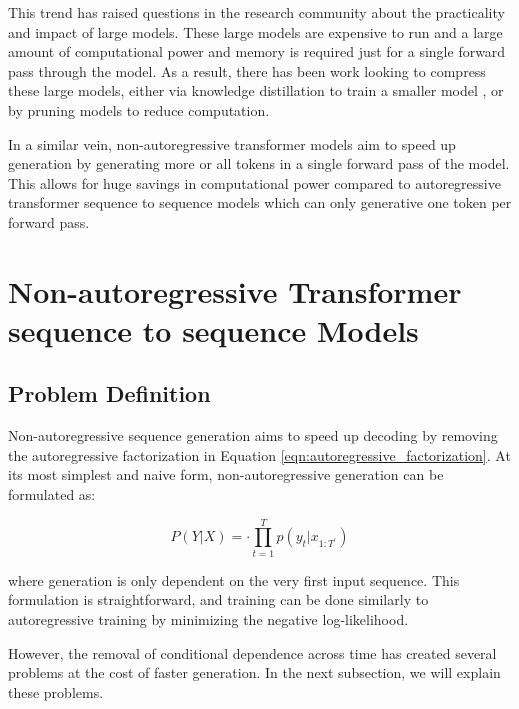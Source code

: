 This trend has raised questions in the research community about the practicality and impact \cite{schwartz_green_ai_2019} of large models. These large models are expensive to run and a large amount of computational power and memory is required just for a single forward pass through the model. As a result, there has been work looking to compress these large models, either via knowledge distillation \cite{hinton_distilling_2015} to train a smaller model \cite{sanh_distilbert_2020}, or by pruning \cite{rogers_primer_in_bert_2020,chen_lottery_2020,frankle_lottery_2019} models to reduce computation.

In a similar vein, non-autoregressive transformer models aim to speed up generation by generating more or all tokens in a single forward pass of the model. This allows for huge savings in computational power compared to  autoregressive transformer sequence to sequence models \cite{vaswani_attention_2017, brown_language_2020_gpt3, radford_language_nodate_gpt2} which can only generative one token per forward pass.



\section{Non-autoregressive Transformer sequence to sequence Models} \label{sec:NAT model}

\subsection{Problem Definition} \label{subsec:problem_def}
Non-autoregressive sequence generation aims to speed up decoding by removing the autoregressive factorization in Equation \ref{eqn:autoregressive_factorization}. At its most simplest and naive form, non-autoregressive generation can be formulated as:

\begin{equation}
\label{eqn:naive_non_autoregressive_formulation} 
P(Y|X) = \cdot \prod_{t=1}^{T}p(y_t|x_{1:T^\prime})
\end{equation}

where generation is only dependent on the very first input sequence. This formulation is straightforward, and training can be done similarly to autoregressive training by minimizing the negative log-likelihood.

However, the removal of conditional dependence across time has created several problems at the cost of faster generation. In the next subsection, we will explain these problems.

